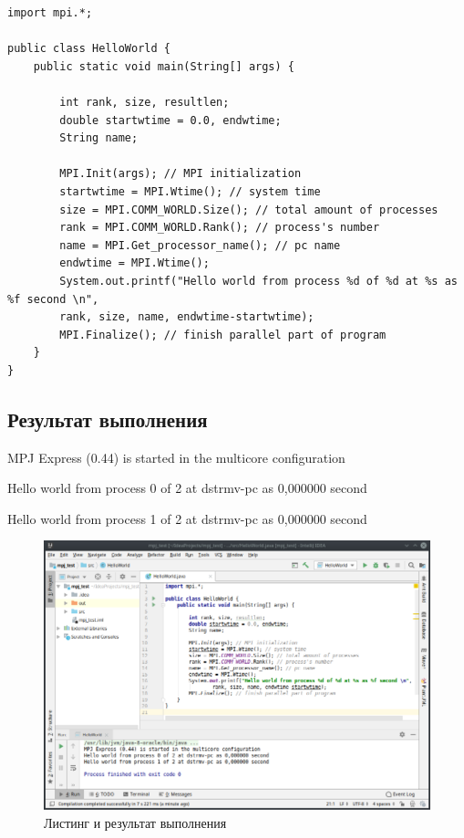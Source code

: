 \documentclass[titlepage,oneside,final,14pt]{extarticle} %
\begin{document}
\begin{lstlisting}
import mpi.*;

public class HelloWorld {
    public static void main(String[] args) {

        int rank, size, resultlen;
        double startwtime = 0.0, endwtime;
        String name;

        MPI.Init(args); // MPI initialization
        startwtime = MPI.Wtime(); // system time
        size = MPI.COMM_WORLD.Size(); // total amount of processes
        rank = MPI.COMM_WORLD.Rank(); // process's number
        name = MPI.Get_processor_name(); // pc name
        endwtime = MPI.Wtime();
        System.out.printf("Hello world from process %d of %d at %s as %f second \n",
        rank, size, name, endwtime-startwtime);
        MPI.Finalize(); // finish parallel part of program
    }
}

\end{lstlisting}

\subsection{Результат выполнения}


\ttfamily
\noindent
MPJ Express (0.44) is started in the multicore configuration

\noindent
Hello world from process 0 of 2 at dstrmv-pc as 0,000000 second
 
\noindent
Hello world from process 1 of 2 at dstrmv-pc as 0,000000 second 

\normalfont

\begin{figure}[H]
	\includegraphics[width=0.9\linewidth]{code_listing_results}
	\centering
	\caption{Листинг и результат выполнения}
\end{figure}
\end{document}
